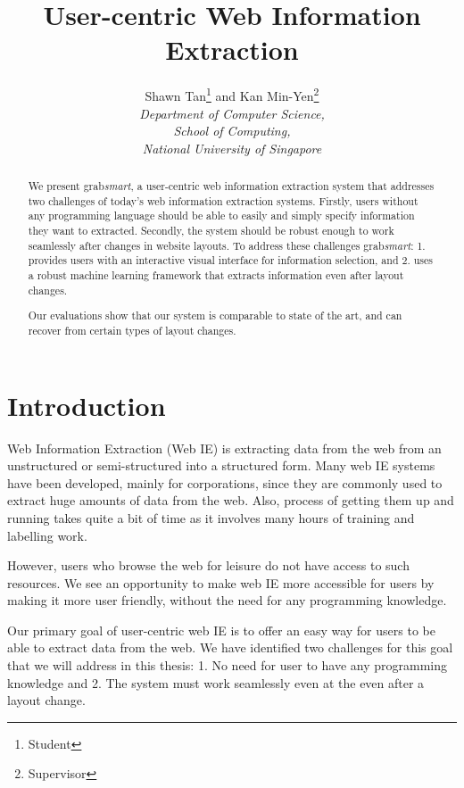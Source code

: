\documentclass[a4paper,12pt]{nurop}
\begin{document}
\title{User-centric Web Information Extraction}

\author{\large{Shawn Tan}\footnote{Student} and \large{Kan Min-Yen}\footnote{Supervisor}\\
	\normalsize\textit{Department of Computer Science,\\
	School of Computing,\\
	National University of Singapore} 
}
\maketitle

\begin{abstract}
We present grab\textit{smart}, a user-centric web information extraction system that
addresses two challenges of today's web information extraction systems. Firstly, users
without any programming language should be able to easily and simply specify information
they want to extracted. Secondly, the system should be robust enough to work seamlessly
after changes in website layouts. To address these challenges grab\textit{smart}: 1.
provides users with an interactive visual interface for information selection, and 2.
uses a robust machine learning framework that extracts information even after layout changes.

Our evaluations show that our system is comparable to state of the art,
and can recover from certain types of layout changes.
\end{abstract}

\section{Introduction}
Web Information Extraction (Web IE) is extracting data from the web from an unstructured or
semi-structured into a structured form. Many web IE systems have been developed, mainly for
corporations, since they are commonly used to extract huge amounts of data from the web.
Also, process of getting them up and running takes quite a bit of time as it involves many
hours of training and labelling work.

However, users who browse the web for leisure do not have access to such resources.
We see an opportunity to make web IE more accessible for users by making it more user friendly,
without the need for any programming knowledge.

Our primary goal of user-centric web IE is to offer an easy way for users to be able to extract
data from the web. We have identified two challenges for this goal that we will address in this
thesis: 1. No need for user to have any programming knowledge and 2. The system must work seamlessly even at the 
even after a layout change.
\end{document}
